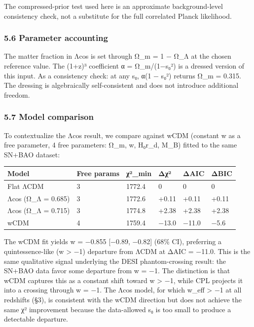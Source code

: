 The compressed-prior test used here is an approximate background-level
consistency check, not a substitute for the full correlated Planck
likelihood.

\subsubsection{5.6 Parameter accounting}\label{parameter-accounting}

The matter fraction in Λcos is set through Ω\_m = 1 − Ω\_Λ at the chosen
reference value. The (1+z)³ coefficient α = Ω\_m/(1−s₀²) is a dressed
version of this input. As a consistency check: at any s₀, α(1 − s₀²)
returns Ω\_m = 0.315. The dressing is algebraically self-consistent and
does not introduce additional freedom.

\subsubsection{5.7 Model comparison}\label{model-comparison}

To contextualize the Λcos result, we compare against wCDM (constant w as
a free parameter, 4 free parameters: Ω\_m, w, H₀r\_d, M\_B) fitted to
the same SN+BAO dataset:

{\def\LTcaptype{none} %
\begin{longtable}[]{@{}llllll@{}}
\toprule\noalign{}
Model & Free params & χ²\_min & Δχ² & ΔAIC & ΔBIC \\
\midrule\noalign{}
\endhead
\bottomrule\noalign{}
\endlastfoot
Flat ΛCDM & 3 & 1772.4 & 0 & 0 & 0 \\
Λcos (Ω\_Λ = 0.685) & 3 & 1772.6 & +0.11 & +0.11 & +0.11 \\
Λcos (Ω\_Λ = 0.715) & 3 & 1774.8 & +2.38 & +2.38 & +2.38 \\
wCDM & 4 & 1759.4 & −13.0 & −11.0 & −5.6 \\
\end{longtable}
}

The wCDM fit yields w = −0.855 {[}−0.89, −0.82{]} (68\% CI), preferring
a quintessence-like (w \textgreater{} −1) departure from ΛCDM at ΔAIC =
−11.0. This is the same qualitative signal underlying the DESI
phantom-crossing result: the SN+BAO data favor some departure from w =
−1. The distinction is that wCDM captures this as a constant shift
toward w \textgreater{} −1, while CPL projects it into a crossing
through w = −1. The Λcos model, for which w\_eff \textgreater{} −1 at
all redshifts (§3), is consistent with the wCDM direction but does not
achieve the same χ² improvement because the data-allowed s₀ is too small
to produce a detectable departure.


